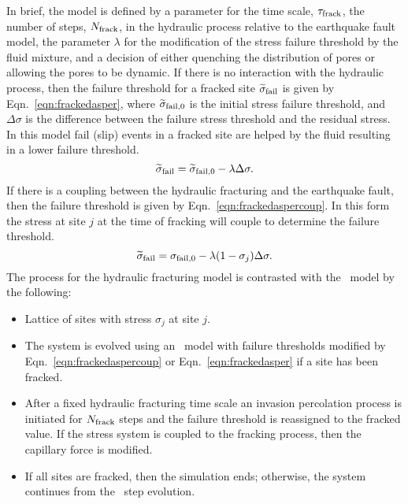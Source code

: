 In brief, the model is defined by a parameter for the time scale,  $\tau_{\rm frack}$, the number of steps, $N_{\rm frack}$, in the hydraulic process relative to the earthquake fault model,  the parameter $\lambda$ for the modification of the stress failure threshold by the fluid mixture, and a  decision of either quenching the distribution of pores or allowing the pores to be dynamic. If there is no interaction with the hydraulic process, then the failure threshold for a fracked site $\widetilde{\sigma}_{\rm fail}$ is given by Eqn.~\eqref{eqn:frackedasper}, where $\widetilde{\sigma}_{\rm fail,0}$ is the initial stress failure threshold, and $\Delta \sigma$ is the difference between the failure stress threshold and the residual stress. In this model fail (slip) events in a fracked site are helped by the fluid resulting in a lower failure threshold.  %
\begin{equation}
\widetilde{\sigma}_{\rm fail} = \widetilde{\sigma}_{\rm fail,0} - \lambda  \Delta \sigma.
  \label{eqn:frackedasper}
\end{equation}  %
If there is a coupling between the hydraulic fracturing and the earthquake fault, then the failure threshold is given by Eqn.~\eqref{eqn:frackedaspercoup}. In this  form the stress at site  $j$  at the time of fracking will couple to determine the failure threshold.   %
\begin{equation}
\widetilde{\sigma}_{\rm fail} = \sigma_{\rm fail,0} - \lambda  ( 1 -\sigma_j)  \Delta \sigma.
  \label{eqn:frackedaspercoup}
\end{equation}%
The process for the hydraulic fracturing model is contrasted with the \ofc\ model by the following:   %
\begin{itemize}
	\item Lattice of sites with stress $\sigma_j$ at site $j$.
	\item The system is evolved using an \ofc\ model with failure thresholds modified by Eqn.~\eqref{eqn:frackedaspercoup} or Eqn.~\eqref{eqn:frackedasper} if a site has been fracked.
	\item After a fixed hydraulic fracturing time scale an invasion percolation process is initiated for $N_{\rm frack}$ steps and the failure threshold is reassigned to the fracked value. If the stress system is coupled to the fracking process, then the capillary force is modified. 	
	\item If all sites are fracked, then the simulation ends; otherwise, the system continues from the \ofc\ step evolution. 	
\end{itemize}  %
